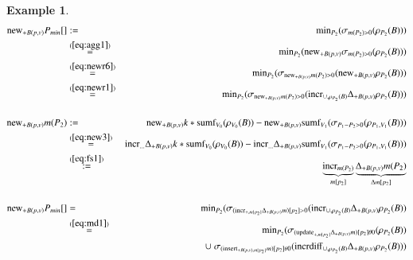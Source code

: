 \documentclass{article}
\newtheorem{example}[theorem]{Example}
\begin{document}
\begin{example}
\begin{eqnarray*}
\algnew_{+B(p,v)} P_{min}[]
&:=&
\algmin_{P_2}(\sigma_{m(P_2) > 0} (\rho_{P_2}(B)))
\\ 
&\stackrel{(\ref{eq:agg1})}{=}&
\algmin_{P_2}(\algnew_{+B(p,v)} \sigma_{m(P_2) > 0} (\rho_{P_2}(B)))
\\
&\stackrel{(\ref{eq:newr6})}{=}&
\algmin_{P_2}(\sigma_{\algnew_{+B(p,v)} m(P_2) > 0} (
\algnew_{+B(p,v)} \rho_{P_2}(B)))
\\
&\stackrel{(\ref{eq:newr1})}{=}&
\algmin_{P_2}(
\sigma_{\algnew_{+B(p,v)} m(P_2) > 0} 
(\algincr_{\cup, \rho_{P_2}(B)} \Delta_{+B(p,v)} \rho_{P_2}(B)))
%
%
%
\\[3ex]
\algnew_{+B(p,v)} m(P_2)
&:=&
\algnew_{+B(p,v)} k* \algsumf_{V_0}(\rho_{V_0}(B))
-
\algnew_{+B(p,v)} \algsumf_{V_1}(\sigma_{P_1 - P_2 > 0}(\rho_{P_1,V_1}(B)))
\\
&\stackrel{(\ref{eq:new3})}{=}&
\algincr_{\dots} \Delta_{+B(p,v)} k* \algsumf_{V_0}(\rho_{V_0}(B))
-
\algincr_{\dots} \Delta_{+B(p,v)}
\algsumf_{V_1}(\sigma_{P_1 - P_2 > 0}(\rho_{P_1,V_1}(B)))
\\
&\stackrel{(\ref{eq:fs1})}{:=}&
\underbrace{\algincr_{m(P_2)}}_{m[p_2]}
\underbrace{\Delta_{+B(p,v)} m(P_2)}_{\Delta m[p_2]}
\\[3ex]
%
%
%
\algnew_{+B(p,v)} P_{min}[]
&=&
\algmin_{P_2}
(\sigma_{(\algincr_{+, m[p_2]} \Delta_{+B(p,v)} m)[p_2] > 0}
(\algincr_{\cup, \rho_{P_2}(B)} \Delta_{+B(p,v)} \rho_{P_2}(B))
\\
&\stackrel{(\ref{eq:md1})}{=}&
\algmin_{P_2}
(\sigma_{(\algupdate_{+, m[p_2]} \Delta_{+B(p,v)} m)[p_2] \theta 0}(\rho_{P_2} (B))
\nonumber \\
&& \cup \;
\sigma_{(\alginsert_{+B(p,v), m[p_2]} m)[p_2] \theta 0}
(\algincrdiff_{\cup, \rho_{P_2}(B)} \Delta_{+B(p,v)} \rho_{P_2}(B)))
\end{eqnarray*}



\end{example}
\end{document}
